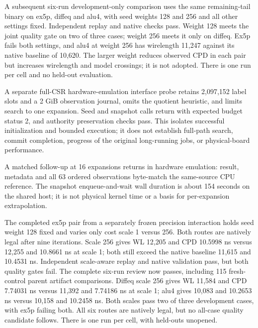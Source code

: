 \documentclass[10pt]{article}
\begin{document}
A subsequent six-run development-only comparison uses the same remaining-tail
binary on ex5p, diffeq and alu4, with seed weights 128 and 256 and all other
settings fixed. Independent replay and native checks pass. Weight 128 meets
the joint quality gate on two of three cases; weight 256 meets it only on
diffeq. Ex5p fails both settings, and alu4 at weight 256 has wirelength
11,247 against its native baseline of 10,620. The larger weight reduces
observed CPD in each pair but increases wirelength and model crossings;
it is not adopted. There is one run per cell and no held-out evaluation.

A separate full-CSR hardware-emulation interface probe retains 2,097,152
label slots and a 2 GiB observation journal, omits the quotient heuristic,
and limits search to one expansion. Seed and snapshot calls return with
expected budget status 2, and authority preservation checks pass. This
isolates successful initialization and bounded execution; it does not
establish full-path search, commit completion, progress of the original
long-running jobs, or physical-board performance.

A matched follow-up at 16 expansions returns in hardware emulation: result,
metadata and all 63 ordered observations byte-match the same-source CPU
reference. The snapshot enqueue-and-wait wall duration is about 154 seconds
on the shared host; it is not physical kernel time or a basis for
per-expansion extrapolation.

The completed ex5p pair from a separately frozen precision interaction
holds seed weight 128 fixed and varies only cost scale 1 versus 256.
Both routes are natively legal after nine iterations. Scale 256 gives
WL 12,205 and CPD 10.5998 ns versus 12,255 and 10.8661 ns at scale 1;
both still exceed the native baseline 11,615 and 10.4531 ns. Independent
scale-aware replay and native validation pass, but both quality gates fail.
The complete six-run review now passes, including 115 fresh-control parent
artifact comparisons. Diffeq scale 256 gives WL 11,584 and CPD 7.74031 ns
versus 11,392 and 7.74186 ns at scale 1; alu4 gives 10,083 and 10.2653 ns
versus 10,158 and 10.2458 ns. Both scales pass two of three development cases,
with ex5p failing both. All six routes are natively legal, but no all-case
quality candidate follows. There is one run per cell, with held-outs unopened.
\end{document}
